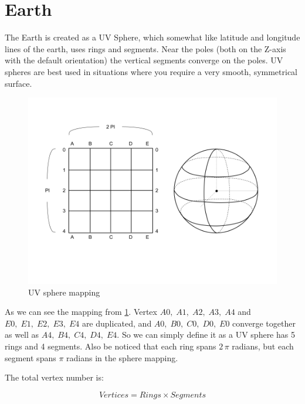 \section{Earth}

The Earth is created as a UV Sphere, which somewhat like latitude and longitude lines of the earth, uses rings and segments. Near the poles (both on the Z-axis with the default orientation) the vertical segments converge on the poles. UV spheres are best used in situations where you require a very smooth, symmetrical surface.

\begin{figure}[H]
\caption[uv-sphere-mapping]{UV sphere mapping}
\label{fig:uv-sphere-mapping}
\centering
\includegraphics[width=\linewidth]{Figures/uv-sphere-mapping.png}
\decoRule
\end{figure}

As we can see the mapping from \ref{fig:uv-sphere-mapping}. Vertex $A0,\;A1,\;A2,\;A3,\;A4$ and $E0,\;E1,\;E2,\;E3,\;E4$ are duplicated, and $A0,\;B0,\;C0,\;D0,\;E0$ converge together as well as $A4,\;B4,\;C4,\;D4,\;E4$. So we can simply define it as a UV sphere has 5 rings and 4 segments. Also be noticed that each ring spans $2\,\pi$ radians, but each segment spans $\pi$ radians in the sphere mapping.

The total vertex number is:

\begin{equation}
\label{equ:uv-sphere-vertices}
Vertices = Rings \times Segments
\end{equation}

